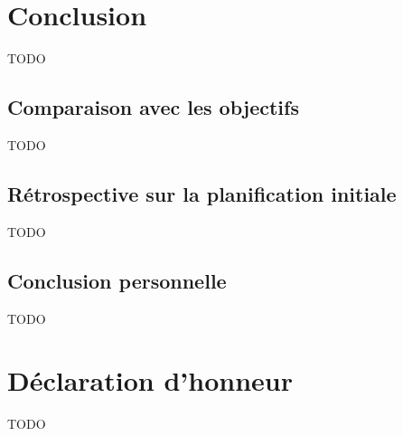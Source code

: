 \documentclass{HEIAarticle}
\begin{document}


\chapter{Conclusion}

TODO

\section{Comparaison avec les objectifs}
\label{conclusioncomparaisonobjectifs}

TODO

\section{Rétrospective sur la planification initiale}
\label{conclusionplanification}

TODO

\section{Conclusion personnelle}

TODO

\chapter{Déclaration d'honneur}

TODO


%

%

%
\end{document}
